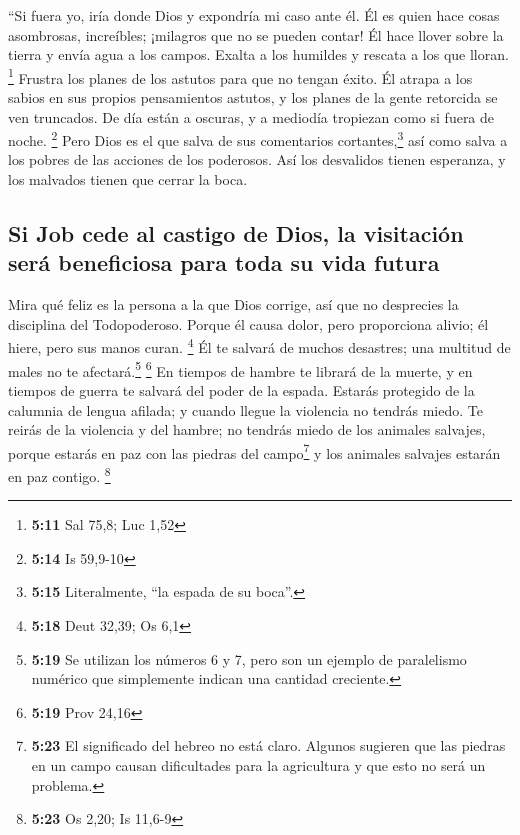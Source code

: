  ``Si fuera yo, iría donde Dios y expondría mi caso ante
él.  Él es quien hace cosas asombrosas, increíbles;
¡milagros que no se pueden contar!  Él hace llover sobre
la tierra y envía agua a los campos.  Exalta a los
humildes y rescata a los que lloran. \footnote{\textbf{5:11} Sal 75,8;
  Luc 1,52}  Frustra los planes de los astutos para que
no tengan éxito.  Él atrapa a los sabios en sus propios
pensamientos astutos, y los planes de la gente retorcida se ven
truncados.  De día están a oscuras, y a mediodía
tropiezan como si fuera de noche. \footnote{\textbf{5:14} Is 59,9-10}
 Pero Dios es el que salva de sus comentarios
cortantes,\footnote{\textbf{5:15} Literalmente, ``la espada de su
  boca''.} así como salva a los pobres de las acciones de los poderosos.
 Así los desvalidos tienen esperanza, y los malvados
tienen que cerrar la boca.

\hypertarget{si-job-cede-al-castigo-de-dios-la-visitaciuxf3n-seruxe1-beneficiosa-para-toda-su-vida-futura}{%
\subsection{Si Job cede al castigo de Dios, la visitación será
beneficiosa para toda su vida
futura}\label{si-job-cede-al-castigo-de-dios-la-visitaciuxf3n-seruxe1-beneficiosa-para-toda-su-vida-futura}}

 Mira qué feliz es la persona a la que Dios corrige, así
que no desprecies la disciplina del Todopoderoso.  Porque
él causa dolor, pero proporciona alivio; él hiere, pero sus manos curan.
\footnote{\textbf{5:18} Deut 32,39; Os 6,1}  Él te
salvará de muchos desastres; una multitud de males no te
afectará.\footnote{\textbf{5:19} Se utilizan los números 6 y 7, pero son
  un ejemplo de paralelismo numérico que simplemente indican una
  cantidad creciente.} \footnote{\textbf{5:19} Prov 24,16}
 En tiempos de hambre te librará de la muerte, y en
tiempos de guerra te salvará del poder de la espada. 
Estarás protegido de la calumnia de lengua afilada; y cuando llegue la
violencia no tendrás miedo.  Te reirás de la violencia y
del hambre; no tendrás miedo de los animales salvajes, 
porque estarás en paz con las piedras del campo\footnote{\textbf{5:23}
  El significado del hebreo no está claro. Algunos sugieren que las
  piedras en un campo causan dificultades para la agricultura y que esto
  no será un problema.} y los animales salvajes estarán en paz contigo.
\footnote{\textbf{5:23} Os 2,20; Is 11,6-9}

